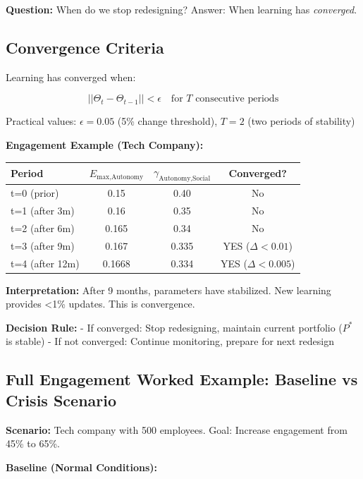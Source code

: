 \textbf{Question:} When do we stop redesigning? Answer: When learning has \textit{converged}.

\subsection{Convergence Criteria}

Learning has converged when:

\begin{equation}
||\Theta_t - \Theta_{t-1}|| < \epsilon \quad \text{for } T \text{ consecutive periods}
\label{eq:21-convergence}
\end{equation}

Practical values: $\epsilon = 0.05$ (5\% change threshold), $T = 2$ (two periods of stability)

\textbf{Engagement Example (Tech Company):}

\begin{center}
\begin{tabular}{lccc}
\toprule
\textbf{Period} & $E_{\text{max,Autonomy}}$ & $\gamma_{\text{Autonomy,Social}}$ & Converged? \\
\midrule
t=0 (prior) & 0.15 & 0.40 & No \\
t=1 (after 3m) & 0.16 & 0.35 & No \\
t=2 (after 6m) & 0.165 & 0.34 & No \\
t=3 (after 9m) & 0.167 & 0.335 & YES ($\Delta < 0.01$) \\
t=4 (after 12m) & 0.1668 & 0.334 & YES ($\Delta < 0.005$) \\
\bottomrule
\end{tabular}
\end{center}

\textbf{Interpretation:} After 9 months, parameters have stabilized. New learning provides <1\% updates. This is convergence.

\textbf{Decision Rule:}
- If converged: Stop redesigning, maintain current portfolio ($P^*$ is stable)
- If not converged: Continue monitoring, prepare for next redesign

\subsection{Full Engagement Worked Example: Baseline vs Crisis Scenario}

\textbf{Scenario:} Tech company with 500 employees. Goal: Increase engagement from 45\% to 65\%.

\textbf{Baseline (Normal Conditions):}

